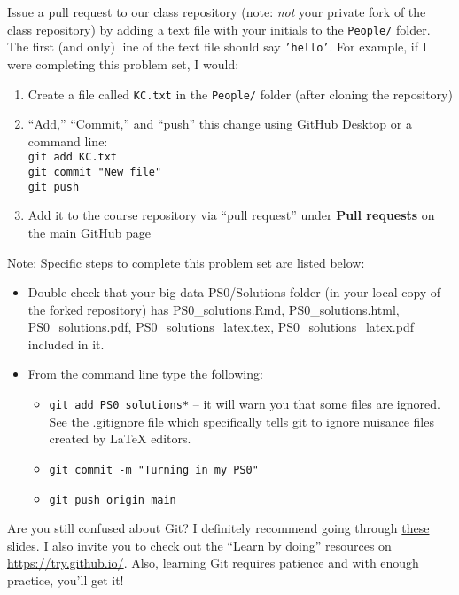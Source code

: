 \documentclass[12pt,english]{exam}
\begin{document}
\begin{questions}
\question Issue a pull request to our class repository (note: \emph{not} your private fork of the class repository) by adding a text file with your initials to the \texttt{People/} folder. The first (and only) line of the text file should say \texttt{'hello'}. For example, if I were completing this problem set, I would:

\begin{enumerate}
  \item Create a file called \texttt{KC.txt} in the \texttt{People/} folder (after cloning the repository)
  \item ``Add,'' ``Commit,'' and ``push'' this change using GitHub Desktop or a command line: \\
  \texttt{git add KC.txt} \\
  \texttt{git commit "New file"} \\
  \texttt{git push} 
  \item Add it to the course repository via ``pull request'' under \textbf{Pull requests} on the main GitHub page
\end{enumerate}

\end{questions}

Note: Specific steps to complete this problem set are listed below:
\begin{itemize}
\item Double check that your big-data-PS0/Solutions folder (in your local copy of the forked repository) has PS0\_solutions.Rmd, PS0\_solutions.html, PS0\_solutions.pdf, PS0\_solutions\_latex.tex, PS0\_solutions\_latex.pdf included in it. 
\item From the command line type the following:
    \begin{itemize}
    \item \texttt{git add PS0\_solutions*} -- it will warn you that some files are ignored. See the .gitignore file which specifically tells git to ignore nuisance files created by LaTeX editors. 
    \item \texttt{git commit -m "Turning in my PS0"}
    \item \texttt{git push origin main}
    \end{itemize}
\end{itemize}

Are you still confused about Git? I definitely recommend going through \href{https://raw.githack.com/uo-ec607/lectures/master/02-git/02-Git.html}{these slides}. I also invite you to check out the ``Learn by doing'' resources on \url{https://try.github.io/}. Also, learning Git requires patience and with enough practice, you'll get it!
\end{document}
